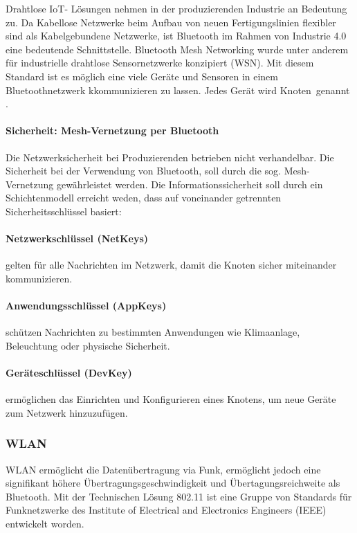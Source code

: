 \documentclass[
fontsize=12pt, 
paper=a4, 
BCOR=10mm, 
twoside=false,
 DIV=10, 
 headsepline, 
 footsepline
 ]{scrartcl}
\begin{document}
Drahtlose IoT- Lösungen nehmen in der produzierenden Industrie an Bedeutung zu. Da Kabellose Netzwerke beim Aufbau von neuen Fertigungslinien flexibler sind als Kabelgebundene Netzwerke, ist Bluetooth im Rahmen von Industrie 4.0 eine bedeutende Schnittstelle. Bluetooth Mesh Networking wurde unter anderem für industrielle drahtlose Sensornetzwerke konzipiert (WSN). Mit diesem Standard ist es möglich eine viele Geräte und Sensoren in einem Bluetoothnetzwerk kkommunizieren zu lassen. Jedes Gerät wird \glqq Knoten\grqq \, genannt \cite{bti40}.

\paragraph{Sicherheit: Mesh-Vernetzung per Bluetooth \cite{bti40}}

Die Netzwerksicherheit bei Produzierenden betrieben nicht verhandelbar. Die Sicherheit bei der Verwendung von Bluetooth, soll durch die sog. Mesh-Vernetzung gewährleistet werden. Die Informationssicherheit soll durch ein Schichtenmodell erreicht weden, dass auf voneinander getrennten Sicherheitsschlüssel basiert:

\paragraph{Netzwerkschlüssel (NetKeys)} gelten für alle Nachrichten im Netzwerk, damit die Knoten sicher miteinander kommunizieren.

\paragraph{Anwendungsschlüssel (AppKeys)} schützen Nachrichten zu bestimmten Anwendungen wie Klimaanlage, Beleuchtung oder physische Sicherheit.

\paragraph{Geräteschlüssel (DevKey)} ermöglichen das Einrichten und Konfigurieren eines Knotens, um neue Geräte zum Netzwerk hinzuzufügen.

\subsubsection{WLAN}

WLAN ermöglicht die Datenübertragung via Funk, ermöglicht jedoch eine signifikant höhere Übertragungsgeschwindigkeit und Übertagungsreichweite als Bluetooth. Mit der Technischen Lösung 802.11 ist eine Gruppe von Standards für Funknetzwerke des Institute of Electrical and Electronics Engineers (IEEE) entwickelt worden. 
\end{document}
